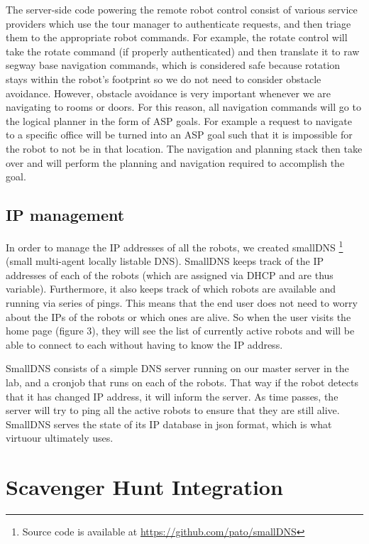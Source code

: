 \documentclass{sig-alternate-05-2015}
\begin{document}
The server-side code powering the remote robot control consist of various
service providers which use the tour manager to authenticate requests, and then
triage them to the appropriate robot commands. For example, the rotate control
will take the rotate command (if properly authenticated) and then translate it
to raw segway base navigation commands, which is considered safe because
rotation stays within the robot's footprint so we do not need to consider
obstacle avoidance. However, obstacle avoidance is very important whenever we
are navigating to rooms or doors. For this reason, all navigation commands will
go to the logical planner in the form of ASP goals. For example a request to
navigate to a specific office will be turned into an ASP goal such that it is
impossible for the robot to not be in that location. The navigation and
planning stack then take over and will perform the planning and navigation
required to accomplish the goal.

\subsection{IP management}

In order to manage the IP addresses of all the robots, we created smallDNS
\footnote{Source code is available at \url{https://github.com/pato/smallDNS}}
(small multi-agent locally listable DNS). SmallDNS keeps track of the IP
addresses of each of the robots (which are assigned via DHCP and are thus
variable). Furthermore, it also keeps track of which robots are available and
running via series of pings. This means that the end user does not need to
worry about the IPs of the robots or which ones are alive. So when the user
visits the home page (figure 3), they will see the list of currently active
robots and will be able to connect to each without having to know the IP
address.

SmallDNS consists of a simple DNS server running on our master server in the
lab, and a cronjob that runs on each of the robots. That way if the robot
detects that it has changed IP address, it will inform the server. As time
passes, the server will try to ping all the active robots to ensure that they
are still alive. SmallDNS serves the state of its IP database in json
format, which is what virtuour ultimately uses.

\section{Scavenger Hunt Integration}
\end{document}
